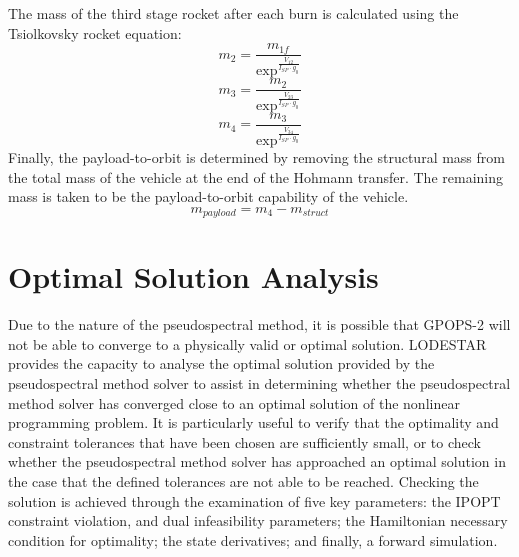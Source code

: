 The mass of the third stage rocket after each burn is calculated using the Tsiolkovsky rocket equation:
\begin{equation}
m_2 = \frac{m_{1f}}{\exp^{\frac{V_{12}}{I_{SP} \cdot g_0}}}
\end{equation}
\begin{equation}
m_3 = \frac{m_{2}}{\exp^{\frac{V_{23}}{I_{SP} \cdot g_0}}}
\end{equation}
\begin{equation}
m_4 = \frac{m_{3}}{\exp^{\frac{V_{34}}{I_{SP} \cdot g_0}}}
\end{equation}
Finally, the payload-to-orbit is determined by removing the structural mass from the total mass of the vehicle at the end of the Hohmann transfer. The remaining mass is taken to be the payload-to-orbit capability of the vehicle.
\begin{equation}
m_{payload} = m_4 - m_{struct}
\end{equation}







\section{Optimal Solution Analysis}\label{sec:verification}
Due to the nature of the pseudospectral method, it is possible that GPOPS-2 will not be able to converge to a physically valid or optimal solution. 
LODESTAR provides the capacity to analyse the optimal solution provided by the pseudospectral method solver to assist in determining whether the pseudospectral method solver has converged close to an optimal solution of the nonlinear programming problem. It is particularly useful to verify that the optimality and constraint tolerances that have been chosen are sufficiently small, or to check whether the pseudospectral method solver has approached an optimal solution in the case that the defined tolerances are not able to be reached.   
Checking the solution is achieved through the examination of five key parameters: the IPOPT constraint violation, and dual infeasibility parameters; the Hamiltonian necessary condition for optimality; the state derivatives; and finally, a forward simulation. 

